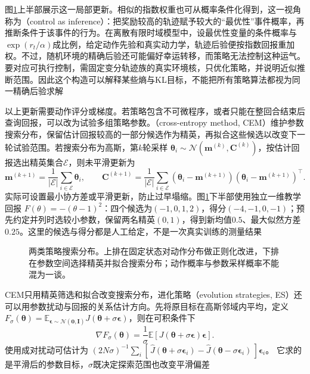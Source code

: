 图\ref{fig:rl-learning-regularized-search}上半部展示这一局部更新。相似的指数权重也可从概率条件化得到，这一视角称为（control as inference）：把奖励较高的轨迹赋予较大的“最优性”事件概率，再推断条件于该事件的行为。在离散有限时域模型中，设最优性变量的条件概率与$\exp(r_t/\alpha)$成比例，给定动作先验和真实动力学，轨迹后验便按指数回报重加权。不过，随机环境的精确后验还可能偏好幸运转移，而策略无法控制这种运气。要对应可执行控制，需固定变分轨迹族的真实环境核，只优化策略，并说明近似推断范围。因此这个构造可以解释某些熵与KL目标，不能把所有策略算法都视为同一精确后验求解

以上更新需要动作评分或梯度。若策略包含不可微程序，或者只能在整回合结束后查询回报，可以改为试验多组策略参数。（cross-entropy method, CEM）维护参数搜索分布，保留估计回报较高的一部分候选作为精英，再拟合这些候选以改变下一轮试验范围。若搜索分布为高斯，第$k$轮采样
$\bm\theta_i\sim\mathcal N(\bm m^{(k)},\bm C^{(k)})$，按估计回报选出精英集合$\mathcal E$，则未平滑更新为
\[
  \bm m^{(k+1)}
       =\frac1{|\mathcal E|}\sum_{i\in\mathcal E}\bm\theta_i,
  \qquad
  \bm C^{(k+1)}
       =\frac1{|\mathcal E|}\sum_{i\in\mathcal E}
       (\bm\theta_i-\bm m^{(k+1)})
       (\bm\theta_i-\bm m^{(k+1)})^\top.
\]
实际可设置最小协方差或平滑更新，防止过早塌缩。图\ref{fig:rl-learning-regularized-search}下半部使用独立一维教学回报
$F(\theta)=-(\theta-1)^2$：四个候选为$(-1,0,1,2)$，得分$(-4,-1,0,-1)$；预先约定并列时选较小参数，保留两名精英$(0,1)$，得到新均值$0.5$、最大似然方差$0.25$。这里的候选与得分都是人工给定，不是一次真实训练的测量结果

\begin{figure}[t]
  \centering
  
  \caption{两类策略搜索分布。上排在固定状态对动作分布做正则化改进，下排在参数空间选择精英并拟合搜索分布；动作概率与参数采样概率不能混为一谈。}
  \label{fig:rl-learning-regularized-search}
\end{figure}

CEM只用精英筛选和拟合改变搜索分布，进化策略（evolution strategies, ES）还可以用参数扰动与回报的关系估计方向。先将原目标在高斯邻域内平均，定义
$F_\sigma(\bm\theta)=
\mathbb E_{\bm\epsilon\sim\mathcal N(\bm0,\bm I)}
J(\bm\theta+\sigma\bm\epsilon)$，则在可积条件下
\[
  \nabla F_\sigma(\bm\theta)
    =\frac1{\sigma}\mathbb E[J(\bm\theta+\sigma\bm\epsilon)\bm\epsilon].
\]
使用成对扰动可估计为
$(2N\sigma)^{-1}\sum_i
[\,\widehat J(\bm\theta+\sigma\bm\epsilon_i)
-\widehat J(\bm\theta-\sigma\bm\epsilon_i)\,]\bm\epsilon_i$。
它求的是平滑后的参数目标，$\sigma$既决定探索范围也改变平滑偏差

